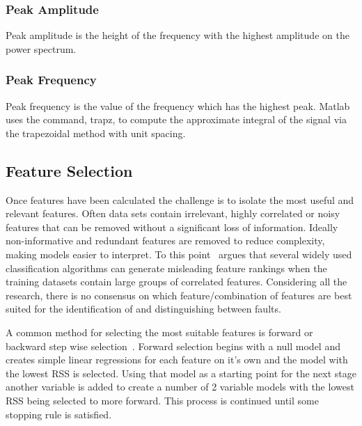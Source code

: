 \documentclass[]{article}
\begin{document}
\subsubsection*{Peak Amplitude}
Peak amplitude is the height of the frequency with the highest amplitude on the power spectrum.
\subsubsection*{Peak Frequency}
Peak frequency is the value of the frequency which has the highest peak. Matlab uses the command, trapz, to compute the approximate integral of the signal via the trapezoidal method with unit spacing.

%
        
\subsection{Feature Selection}
Once features have been calculated the challenge is to isolate the most useful and relevant features. Often data sets contain irrelevant, highly correlated or noisy features that can be removed without a significant loss of information. Ideally non-informative and redundant features are removed to reduce complexity, making models easier to interpret. To this point~\cite{tolocsi2011classification} argues that several widely used classification algorithms can generate misleading feature rankings when the training datasets contain large groups of correlated features. Considering all the research, there is no consensus on which feature/combination of features are best suited for the identification of and distinguishing between faults. 

A common method for selecting the most suitable features is forward or backward step wise selection~\cite{james2013introduction}. Forward selection begins with a null model and creates simple linear regressions for each feature on it's own and the model with the lowest RSS is selected. Using that model as a starting point for the next stage another variable is added to create a number of 2 variable models with the lowest RSS being selected to more forward. This process is continued until some stopping rule is satisfied.
\end{document}
